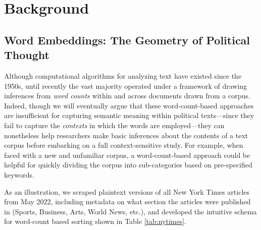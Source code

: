 \documentclass[11pt]{article}
\begin{document}


\section{Background}\label{sec:background}

\subsection{Word Embeddings: The Geometry of Political Thought}\label{sec:embeddings}


Although computational algorithms for analyzing text have existed since the 1950s, until recently the vast majority operated under a framework of drawing inferences from \textit{word counts} within and across documents drawn from a corpus. Indeed, though we will eventually argue that these word-count-based approaches are insufficient for capturing semantic meaning within political texts---since they fail to capture the \textit{contexts} in which the words are employed---they can nonetheless help researchers make basic inferences about the contents of a text corpus before embarking on a full context-sensitive study. For example, when faced with a new and unfamiliar corpus, a word-count-based approach could be helpful for quickly dividing the corpus into sub-categories based on pre-specified keywords.

As an illustration, we scraped plaintext versions of all New York Times articles from May 2022, including metadata on what section the articles were published in (Sports, Business, Arts, World News, etc.), and developed the intuitive schema for word-count based sorting shown in Table \ref{tab:nytimes}.
\end{document}
